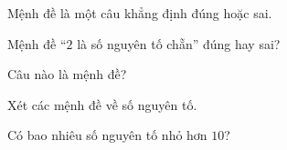 \documentclass[12pt]{article}
\begin{document}

\begin{kienthuc}
Mệnh đề là một câu khẳng định đúng hoặc sai.
\end{kienthuc}

\muctl
\begin{bt}[TH]
Mệnh đề ``$2$ là số nguyên tố chẵn'' đúng hay sai?
\end{bt}
\muctn
\begin{tn}[NB]
Câu nào là mệnh đề?
\end{tn}
\mucds
\begin{ds}
Xét các mệnh đề về số nguyên tố.
\end{ds}
\muctln
\begin{tln}
Có bao nhiêu số nguyên tố nhỏ hơn $10$?
\end{tln}
\bangdapan
\end{document}
